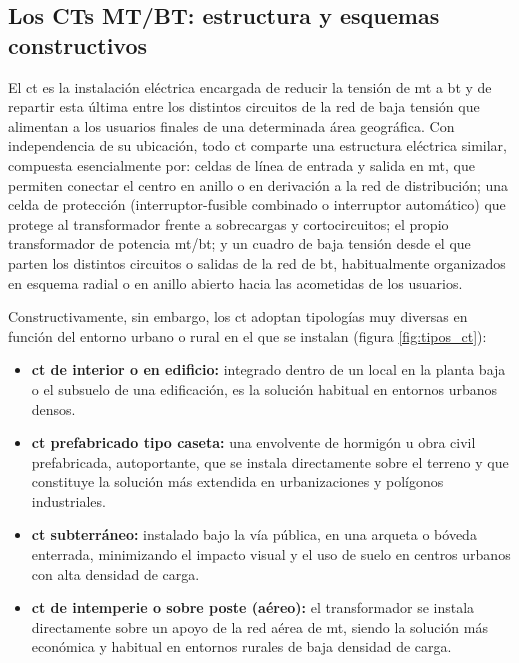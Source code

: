 \subsection{Los CTs MT/BT: estructura y esquemas constructivos}
\label{subsec:estructura_ct}

El \gls{ct} es la instalación eléctrica encargada de reducir la tensión de \gls{mt} a \gls{bt} y de repartir esta última entre los distintos circuitos de la red de baja tensión que alimentan a los usuarios finales de una determinada área geográfica. Con independencia de su ubicación, todo \gls{ct} comparte una estructura eléctrica similar, compuesta esencialmente por: celdas de línea de entrada y salida en \gls{mt}, que permiten conectar el centro en anillo o en derivación a la red de distribución; una celda de protección (interruptor-fusible combinado o interruptor automático) que protege al transformador frente a sobrecargas y cortocircuitos; el propio transformador de potencia \gls{mt}/\gls{bt}; y un cuadro de baja tensión desde el que parten los distintos circuitos o salidas de la red de \gls{bt}, habitualmente organizados en esquema radial o en anillo abierto hacia las acometidas de los usuarios.

Constructivamente, sin embargo, los \gls{ct} adoptan tipologías muy diversas en función del entorno urbano o rural en el que se instalan (figura \ref{fig:tipos_ct}):
\begin{itemize}
    \item \textbf{\gls{ct} de interior o en edificio:} integrado dentro de un local en la planta baja o el subsuelo de una edificación, es la solución habitual en entornos urbanos densos.
    \item \textbf{\gls{ct} prefabricado tipo caseta:} una envolvente de hormigón u obra civil prefabricada, autoportante, que se instala directamente sobre el terreno y que constituye la solución más extendida en urbanizaciones y polígonos industriales.
    \item \textbf{\gls{ct} subterráneo:} instalado bajo la vía pública, en una arqueta o bóveda enterrada, minimizando el impacto visual y el uso de suelo en centros urbanos con alta densidad de carga.
    \item \textbf{\gls{ct} de intemperie o sobre poste (aéreo):} el transformador se instala directamente sobre un apoyo de la red aérea de \gls{mt}, siendo la solución más económica y habitual en entornos rurales de baja densidad de carga.
\end{itemize}

